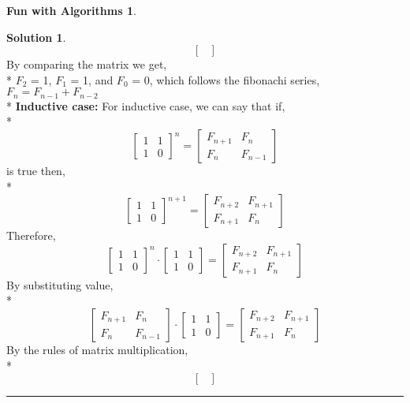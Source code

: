 \documentclass{article}
\theoremstyle{definition}
\newtheorem*{fun}{Fun with Algorithms}
\def\fline{\rule{0.75\linewidth}{0.5pt}}
\newcommand{\finishline}{\vspace{-15pt}\begin{center}\fline\end{center}}
\newtheorem*{solution*}{Solution}
\newenvironment{solution}{\begin{solution*}}{{\finishline} \end{solution*}}
\begin{document}
\begin{fun}
\begin{enumerate}[label=(\alph*)]
\begin{solution}
\[\begin{bmatrix}
			\end{bmatrix}
		\]
		By comparing the matrix we get,\\*
		$F_2$ = 1, $ F_1$ = 1, and $ F_0$ = 0, which follows the fibonachi series, $ F_n = F_{n-1} + F_{n-2}$ \bigskip\\*
		\textbf{Inductive case: } For inductive case, we can say that if, \\*
		\[
		\begin{bmatrix}
			1 & 1 \\
			1 & 0
		\end{bmatrix}^n
			=
	 	\begin{bmatrix}
			F_{n+1} & F_n \\
			F_n & F_{n-1}
		\end{bmatrix}
		\]
		is true then, \\*
		\[
		\begin{bmatrix}
			1 & 1 \\
			1 & 0
		\end{bmatrix}^{n+1}
		=
	 	\begin{bmatrix}
			F_{n+2} & F_{n+1} \\
			F_{n+1} & F_{n}
		\end{bmatrix}
		\]
		Therefore,
		\[
		\begin{bmatrix}
			1 & 1 \\
			1 & 0
		\end{bmatrix}^n
		\cdot
		\begin{bmatrix}
			1 & 1 \\
			1 & 0
		\end{bmatrix}
		=
	 	\begin{bmatrix}
			F_{n+2} & F_{n+1} \\
			F_{n+1} & F_{n}
		\end{bmatrix}
		\]
		By substituting value,  \\*
		\[
	 	\begin{bmatrix}
			F_{n+1} & F_n \\
			F_n & F_{n-1}
		\end{bmatrix}
		\cdot
		\begin{bmatrix}
			1 & 1 \\
			1 & 0
		\end{bmatrix}
		=
	 	\begin{bmatrix}
			F_{n+2} & F_{n+1} \\
			F_{n+1} & F_{n}
		\end{bmatrix}
		\]
		By the rules of matrix multiplication, \\*
		\[
	 	\begin{bmatrix}

\end{bmatrix}\]
\end{solution}
\end{enumerate}
\end{fun}
\end{document}
